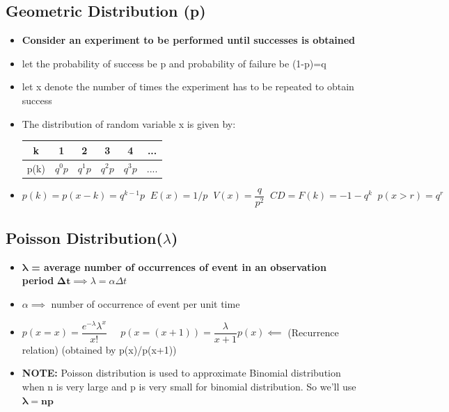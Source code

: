 \documentclass[8pt]{report}
\begin{document}
		\subsection{Geometric Distribution (p)}
			\begin{itemize}
				\item \textbf{Consider an experiment to be performed until successes is obtained} 
				\item let the probability of success be p and probability of failure be (1-p)=q
				\item let x denote the number of times the experiment has to be repeated to obtain success
				\item The distribution of random variable x is given by:
				\begin{table}[H]
					\centering
					\def\arraystretch{1.5}
					\begin{tabular}{|c|c|c|c|c|c|}
						\hline
						k & 1 & 2 & 3 & 4 & ...\\
						\hline
						p(k) & $q^0p$ & $q^1p$ & $q^2p$ & $q^3p$ & ....\\
						\hline
					\end{tabular}
				\end{table}
				\item $\boxed{p(k) = p(x-k) = q^{k-1}p}\;\;\boxed{E(x) = 1/p}\;\;\boxed{V(x)=\dfrac{q}{p^2}}\;\;\boxed{CD = F(k)=-1-q^k}\;\;\boxed{p(x>r)=q^r}$
			\end{itemize}\hrulefill
		\subsection{Poisson Distribution($\lambda$)}
			\begin{itemize}
				\item $\pmb{\lambda}$ \textbf{= average number of occurrences of event in an observation period} $\pmb{\Delta t}\implies \boxed{\lambda = \alpha\Delta t}$ 
				\item $\alpha \implies$ number of occurrence of event per unit time
				\item $\boxed{p(x=x)=\dfrac{e^{-\lambda}\lambda^x}{x!}}\;\;\;\;\;\boxed{p(x=(x+1)) = \dfrac{\lambda}{x+1}p(x)}\impliedby$ (Recurrence relation) (obtained by p(x)/p(x+1))
				\item \textbf{NOTE: } Poisson distribution is used to approximate Binomial distribution when n is very large and p is very small for binomial distribution. So we'll use $\boxed{\pmb{\lambda = np}}$
			\end{itemize}\hrulefill
\end{document}
